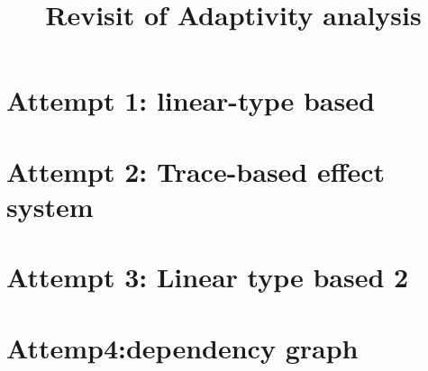 \documentclass[a4paper,11pt]{article}
\title{Revisit of Adaptivity analysis}
\author{}
\date{}
\theoremstyle{definition}
\begin{document}
\maketitle

\section{Attempt 1: linear-type based}



\clearpage
\section{Attempt 2: Trace-based effect system}



\clearpage
\section{Attempt 3: Linear type based 2}




\clearpage
\section{Attemp4:dependency graph}






\end{document}
